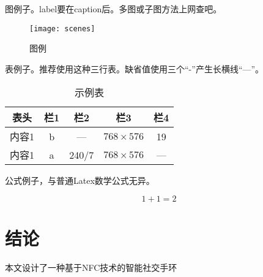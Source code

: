图例子。label要在caption后。多图或子图方法上网查吧。

\begin{figure}[!t]
  \centering
  \texttt{[image: scenes]}
  \caption{图例}
  \label{fig:scenes}
\end{figure}

表例子。推荐使用这种三行表。缺省值使用三个“-”产生长横线“---”。

\begin{table}[!t]
\caption{示例表}
\label{tab:eg}
\vspace{0.5em}
\centering
\wuhao
  \begin{tabular}{ccccc}
  \toprule[1.5pt]
  表头 & 栏1 & 栏2 & 栏3 & 栏4 \\
  \midrule[1pt]
  内容1 & b & --- & $768 \times 576$ & 19 \\
  内容1 & a & 240/7 & $768 \times 576$ & --- \\
  \bottomrule[1.5pt]
  \end{tabular}
\end{table}

公式例子，与普通Latex数学公式无异。

\begin{equation}
1+1=2
\end{equation}







\chapter*{结论}
本文设计了一种基于NFC技术的智能社交手环

 
